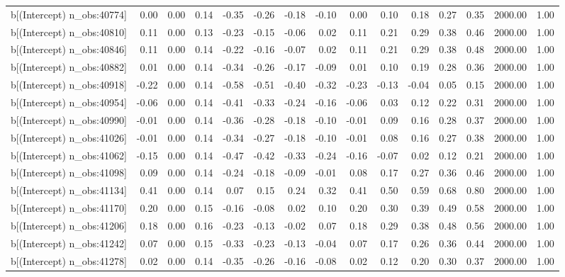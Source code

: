\begin{table}[ht]
\begin{tabular}{rrrrrrrrrrrrrrr}
  b[(Intercept) n\_obs:40774] & 0.00 & 0.00 & 0.14 & -0.35 & -0.26 & -0.18 & -0.10 & 0.00 & 0.10 & 0.18 & 0.27 & 0.35 & 2000.00 & 1.00 \\ 
  b[(Intercept) n\_obs:40810] & 0.11 & 0.00 & 0.13 & -0.23 & -0.15 & -0.06 & 0.02 & 0.11 & 0.21 & 0.29 & 0.38 & 0.46 & 2000.00 & 1.00 \\ 
  b[(Intercept) n\_obs:40846] & 0.11 & 0.00 & 0.14 & -0.22 & -0.16 & -0.07 & 0.02 & 0.11 & 0.21 & 0.29 & 0.38 & 0.48 & 2000.00 & 1.00 \\ 
  b[(Intercept) n\_obs:40882] & 0.01 & 0.00 & 0.14 & -0.34 & -0.26 & -0.17 & -0.09 & 0.01 & 0.10 & 0.19 & 0.28 & 0.36 & 2000.00 & 1.00 \\ 
  b[(Intercept) n\_obs:40918] & -0.22 & 0.00 & 0.14 & -0.58 & -0.51 & -0.40 & -0.32 & -0.23 & -0.13 & -0.04 & 0.05 & 0.15 & 2000.00 & 1.00 \\ 
  b[(Intercept) n\_obs:40954] & -0.06 & 0.00 & 0.14 & -0.41 & -0.33 & -0.24 & -0.16 & -0.06 & 0.03 & 0.12 & 0.22 & 0.31 & 2000.00 & 1.00 \\ 
  b[(Intercept) n\_obs:40990] & -0.01 & 0.00 & 0.14 & -0.36 & -0.28 & -0.18 & -0.10 & -0.01 & 0.09 & 0.16 & 0.28 & 0.37 & 2000.00 & 1.00 \\ 
  b[(Intercept) n\_obs:41026] & -0.01 & 0.00 & 0.14 & -0.34 & -0.27 & -0.18 & -0.10 & -0.01 & 0.08 & 0.16 & 0.27 & 0.38 & 2000.00 & 1.00 \\ 
  b[(Intercept) n\_obs:41062] & -0.15 & 0.00 & 0.14 & -0.47 & -0.42 & -0.33 & -0.24 & -0.16 & -0.07 & 0.02 & 0.12 & 0.21 & 2000.00 & 1.00 \\ 
  b[(Intercept) n\_obs:41098] & 0.09 & 0.00 & 0.14 & -0.24 & -0.18 & -0.09 & -0.01 & 0.08 & 0.17 & 0.27 & 0.36 & 0.46 & 2000.00 & 1.00 \\ 
  b[(Intercept) n\_obs:41134] & 0.41 & 0.00 & 0.14 & 0.07 & 0.15 & 0.24 & 0.32 & 0.41 & 0.50 & 0.59 & 0.68 & 0.80 & 2000.00 & 1.00 \\ 
  b[(Intercept) n\_obs:41170] & 0.20 & 0.00 & 0.15 & -0.16 & -0.08 & 0.02 & 0.10 & 0.20 & 0.30 & 0.39 & 0.49 & 0.58 & 2000.00 & 1.00 \\ 
  b[(Intercept) n\_obs:41206] & 0.18 & 0.00 & 0.16 & -0.23 & -0.13 & -0.02 & 0.07 & 0.18 & 0.29 & 0.38 & 0.48 & 0.56 & 2000.00 & 1.00 \\ 
  b[(Intercept) n\_obs:41242] & 0.07 & 0.00 & 0.15 & -0.33 & -0.23 & -0.13 & -0.04 & 0.07 & 0.17 & 0.26 & 0.36 & 0.44 & 2000.00 & 1.00 \\ 
  b[(Intercept) n\_obs:41278] & 0.02 & 0.00 & 0.14 & -0.35 & -0.26 & -0.16 & -0.08 & 0.02 & 0.12 & 0.20 & 0.30 & 0.37 & 2000.00 & 1.00 \\ 

\end{tabular}
\end{table}
